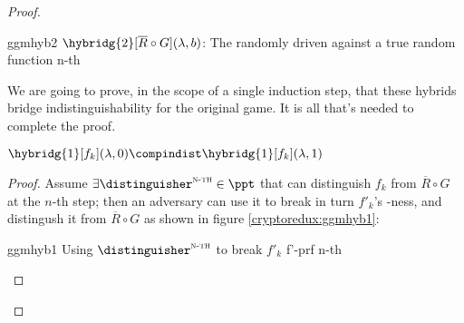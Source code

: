\begin{proof}
\begin{cryptogame}

    \end{cryptogame}

    \begin{cryptogame}
        {ggmhyb2}
        {$\hybridg{2}[\overline{R} \circ G](\lambda, b)$: The randomly driven \prg{} against a true random function}
        {n-th}


        \cseqdelay
        \cseqbeginloop
        \cseqendloop
        \cseqdelay


    \end{cryptogame}
    
    We are going to prove, in the scope of a single induction step, that these hybrids bridge indistinguishability for the original game. It is all that's needed to complete the proof.

    \begin{lemma}
        $\hybridg{1}[f_k](\lambda, 0) \compindist \hybridg{1}[f_k](\lambda, 1)$       
    \end{lemma}

    \begin{proof}
        Assume $\exists \distinguisher^{\textsc{n-th}} \in \ppt$ that can distinguish $f_k$ from $\overline{R} \circ G$ at the $n$-th step; then an adversary \adversary{} can use it to break in turn $f'_k$'s \prf-ness, and distingush it from $\overline{R} \circ G$ as shown in figure \ref{cryptoredux:ggmhyb1}:

        \begin{cryptoredux}
            {ggmhyb1}
            {Using $\distinguisher^{\textsc{n-th}}$ to break $f'_k$}
            {f'-prf}
            {n-th}


\end{cryptoredux}
\end{proof}
\end{proof}
